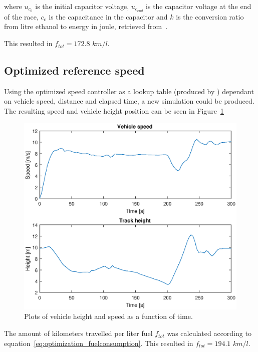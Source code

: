where $u_{c_0}$ is the initial capacitor voltage, $u_{c_{end}}$ is the capacitor
voltage at the end of the race, $c_c$ is the capacitance in the capacitor and
$k$ is the conversion ratio from litre ethanol to energy in joule, retrieved
from~\cite{fuelconversion}.

This resulted in $f_{tot} = 172.8$ $km/l$. %

\subsection{Optimized reference speed}\label{sec:opt_sim_static}
Using the optimized speed controller as a lookup table (produced by
\citep{liu2016}) dependant on vehicle speed, distance and elapsed time, a new
simulation could be produced. The resulting speed and vehicle height position
can be seen in Figure~\ref{fig:optimization_optimal_speed}

\begin{figure}[H]
    \centering
    \includegraphics[width=\textwidth]{./img/optimization_optimal_speed.eps}
    \caption{Plots of vehicle height and speed as a function of
    time.}\label{fig:optimization_optimal_speed}
\end{figure}

The amount of kilometers travelled per liter fuel $f_{tot}$ was calculated
according to equation~\ref{eq:optimization_fuelconsumption}. This resulted in
$f_{tot} = 194.1$ $km/l$. %
